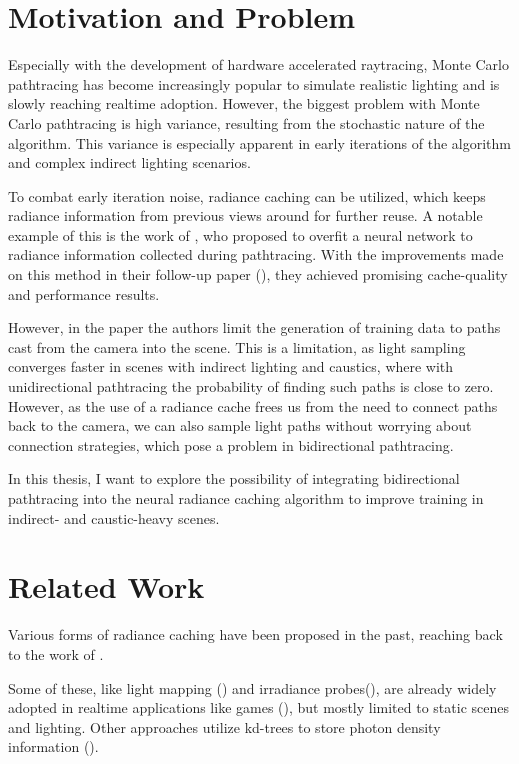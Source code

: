 \section{Motivation and Problem}

Especially with the development of hardware accelerated raytracing, Monte Carlo pathtracing has become increasingly popular to simulate realistic lighting and is slowly reaching realtime adoption.
However, the biggest problem with Monte Carlo pathtracing is high variance, resulting from the stochastic nature of the algorithm.
This variance is especially apparent in early iterations of the algorithm and complex indirect lighting scenarios.


To combat early iteration noise, radiance caching can be utilized, which keeps radiance information from previous views around for further reuse.
A notable example of this is the work of \textcite{muller2021}, who proposed to overfit a neural network to radiance information collected during pathtracing.
With the improvements made on this method in their follow-up paper (\cite{muller2022}), they achieved promising cache-quality and performance results.

However, in the paper the authors limit the generation of training data to paths cast from the camera into the scene.
This is a limitation, as light sampling converges faster in scenes with indirect lighting and caustics, where with unidirectional pathtracing the probability of finding such paths is close to zero.
However, as the use of a radiance cache frees us from the need to connect paths back to the camera, we can also sample light paths without worrying about connection strategies, which pose a problem in bidirectional pathtracing.


In this thesis, I want to explore the possibility of integrating bidirectional pathtracing into the neural radiance caching algorithm to improve training in indirect- and caustic-heavy scenes.

\section{Related Work}

Various forms of radiance caching have been proposed in the past, reaching back to the work of \textcite{ward1988}.


Some of these, like light mapping (\cite{arvo1986}) and irradiance probes(\cite{greger1998}), are already widely adopted in realtime applications like games (\cite{oat2005, abrash1996}), but mostly limited to static scenes and lighting.
Other approaches utilize kd-trees to store photon density information (\cite{jensen1996}).


